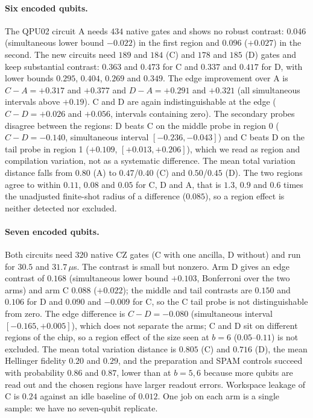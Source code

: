 \documentclass[11pt]{article}
\begin{document}
\paragraph{Six encoded qubits.} The QPU02 circuit A needs $434$ native gates and shows no robust contrast: $0.046$ (simultaneous lower bound $-0.022$) in the first region and $0.096$ ($+0.027$) in the second. The new circuits need $189$ and $184$ (C) and $178$ and $185$ (D) gates and keep substantial contrast: $0.363$ and $0.473$ for C and $0.337$ and $0.417$ for D, with lower bounds $0.295$, $0.404$, $0.269$ and $0.349$. The edge improvement over A is $C-A=+0.317$ and $+0.377$ and $D-A=+0.291$ and $+0.321$ (all simultaneous intervals above $+0.19$). C and D are again indistinguishable at the edge ($C-D=+0.026$ and $+0.056$, intervals containing zero). The secondary probes disagree between the regions: D beats C on the middle probe in region 0 ($C-D=-0.140$, simultaneous interval $[-0.236,-0.043]$) and C beats D on the tail probe in region 1 ($+0.109$, $[+0.013,+0.206]$), which we read as region and compilation variation, not as a systematic difference. The mean total variation distance falls from $0.80$ (A) to $0.47$/$0.40$ (C) and $0.50$/$0.45$ (D). The two regions agree to within $0.11$, $0.08$ and $0.05$ for C, D and A, that is $1.3$, $0.9$ and $0.6$ times the unadjusted finite-shot radius of a difference ($0.085$), so a region effect is neither detected nor excluded.

\paragraph{Seven encoded qubits.} Both circuits need $320$ native CZ gates (C with one ancilla, D without) and run for $30.5$ and $31.7\,\mu$s. The contrast is small but nonzero. Arm D gives an edge contrast of $0.168$ (simultaneous lower bound $+0.103$, Bonferroni over the two arms) and arm C $0.088$ ($+0.022$); the middle and tail contrasts are $0.150$ and $0.106$ for D and $0.090$ and $-0.009$ for C, so the C tail probe is not distinguishable from zero. The edge difference is $C-D=-0.080$ (simultaneous interval $[-0.165,+0.005]$), which does not separate the arms; C and D sit on different regions of the chip, so a region effect of the size seen at $b=6$ ($0.05$--$0.11$) is not excluded. The mean total variation distance is $0.805$ (C) and $0.716$ (D), the mean Hellinger fidelity $0.20$ and $0.29$, and the preparation and SPAM controls succeed with probability $0.86$ and $0.87$, lower than at $b=5,6$ because more qubits are read out and the chosen regions have larger readout errors. Workspace leakage of C is $0.24$ against an idle baseline of $0.012$. One job on each arm is a single sample: we have no seven-qubit replicate.
\end{document}

